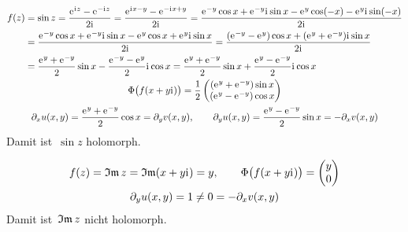 \documentclass[../full]{subfiles}
\begin{document}

    \begin{gather*}
        \begin{aligned}
            f \paren{z} &
            = \sin z
            = \frac{\eEuler^{\iComplex z} - \eEuler^{-\iComplex z}}{2 \iComplex}
            = \frac
                {\eEuler^{\iComplex x - y} - \eEuler^{-\iComplex x + y}}
                {2 \iComplex}
            = \frac{
                    \eEuler^{-y} \cos x + \eEuler^{-y} \iComplex \sin x
                    - \eEuler^y \cos \paren{-x}
                        - \eEuler^y \iComplex \sin \paren{-x}
                }{2 \iComplex}
            \\ &
            = \frac{
                    \eEuler^{-y} \cos x + \eEuler^{-y} \iComplex \sin x
                    - \eEuler^y \cos x + \eEuler^y \iComplex \sin x
                }{2 \iComplex}
            = \frac{
                    \paren{\eEuler^{-y} - \eEuler^y} \cos x
                    + \paren{\eEuler^y + \eEuler^{-y}} \iComplex \sin x
                }{2 \iComplex}
            \\ &
            = \frac{\eEuler^y + \eEuler^{-y}}{2} \sin x
                - \frac{\eEuler^{-y} - \eEuler^y}{2} \iComplex \cos x
            = \frac{\eEuler^y + \eEuler^{-y}}{2} \sin x
                + \frac{\eEuler^y - \eEuler^{-y}}{2} \iComplex \cos x
        \end{aligned}
        \\
        \Phi \paren[\big]{f \paren{x + y \iComplex}}
        = \frac{1}{2} \begin{pmatrix}
            \paren{\eEuler^y + \eEuler^{-y}} \sin x \\
            \paren{\eEuler^y - \eEuler^{-y}} \cos x
        \end{pmatrix}
        \\
        \partial_x u \paren{x, y}
        = \frac{\eEuler^y + \eEuler^{-y}}{2} \cos x
        = \partial_y v \paren{x, y}
        , \qquad
        \partial_y u \paren{x, y}
        = \frac{\eEuler^y - \eEuler^{-y}}{2} \sin x
        = -\partial_x v \paren{x, y}
    \end{gather*}
    Damit ist~\( \sin z \) holomorph.



    \begin{gather*}
        f \paren{z} = \ImagPart z = \ImagPart \paren{x + y \iComplex} = y
        , \qquad
        \Phi \paren[\big]{f \paren{x + y \iComplex}}
        = \begin{pmatrix} y \\ 0 \end{pmatrix}
        \\
        \partial_y u \paren{x, y} = 1 \neq 0 = -\partial_x v \paren{x, y}
    \end{gather*}
    Damit ist~\( \ImagPart z \) nicht holomorph.
\end{document}
